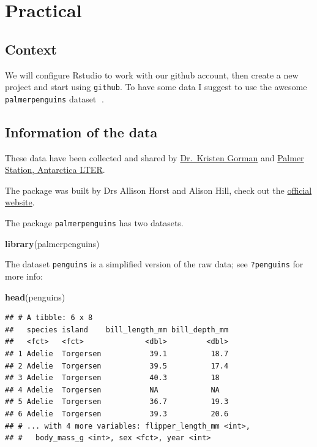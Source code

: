 \documentclass[
  12pt,
]{book}
\newenvironment{Shaded}{\begin{snugshade}}{\end{snugshade}}
\newcommand{\KeywordTok}[1]{\textcolor[rgb]{0.13,0.29,0.53}{\textbf{#1}}}
\newcommand{\NormalTok}[1]{#1}
\begin{document}
\hypertarget{practical-1}{%
\section{Practical}\label{practical-1}}

\hypertarget{context-1}{%
\subsection{Context}\label{context-1}}

We will configure Rstudio to work with our github account, then create a new project and start using \texttt{github}. To have some data I suggest to use the awesome \texttt{palmerpenguins} dataset 🐧.

\hypertarget{information-of-the-data}{%
\subsection{Information of the data}\label{information-of-the-data}}

These data have been collected and shared by \href{https://www.uaf.edu/cfos/people/faculty/detail/kristen-gorman.php}{Dr.~Kristen Gorman} and \href{https://pal.lternet.edu/}{Palmer Station, Antarctica LTER}.

The package was built by Drs Allison Horst and Alison Hill, check out the \href{https://allisonhorst.github.io/palmerpenguins/}{official website}.

The package \texttt{palmerpenguins} has two datasets.

\begin{Shaded}
\begin{Highlighting}[]
\KeywordTok{library}\NormalTok{(palmerpenguins)}
\end{Highlighting}
\end{Shaded}

The dataset \texttt{penguins} is a simplified version of the raw data; see \texttt{?penguins} for more info:

\begin{Shaded}
\begin{Highlighting}[]
\KeywordTok{head}\NormalTok{(penguins)}
\end{Highlighting}
\end{Shaded}

\begin{verbatim}
## # A tibble: 6 x 8
##   species island    bill_length_mm bill_depth_mm
##   <fct>   <fct>              <dbl>         <dbl>
## 1 Adelie  Torgersen           39.1          18.7
## 2 Adelie  Torgersen           39.5          17.4
## 3 Adelie  Torgersen           40.3          18  
## 4 Adelie  Torgersen           NA            NA  
## 5 Adelie  Torgersen           36.7          19.3
## 6 Adelie  Torgersen           39.3          20.6
## # ... with 4 more variables: flipper_length_mm <int>,
## #   body_mass_g <int>, sex <fct>, year <int>
\end{verbatim}
\end{document}
